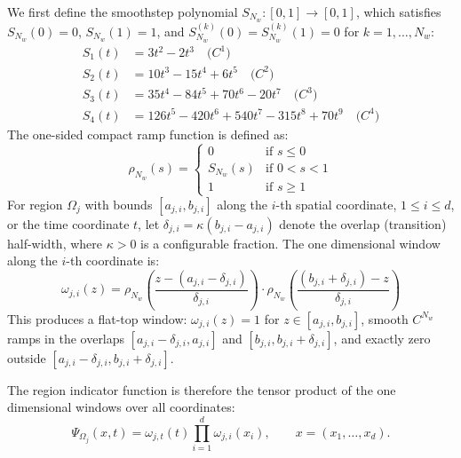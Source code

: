We first define the smoothstep polynomial $S_{N_w} : [0,1] \to [0,1]$,
which satisfies $S_{N_w}(0) = 0$, $S_{N_w}(1) = 1$, and
$S_{N_w}^{(k)}(0) = S_{N_w}^{(k)}(1) = 0$ for $k = 1, \ldots, N_w$:
\begin{align}
S_1(t) &= 3t^2 - 2t^3 \quad \text{($C^1$)} \\
S_2(t) &= 10t^3 - 15t^4 + 6t^5 \quad \text{($C^2$)} \\
S_3(t) &= 35t^4 - 84t^5 + 70t^6 - 20t^7 \quad \text{($C^3$)} \\
S_4(t) &= 126t^5 - 420t^6 + 540t^7 - 315t^8 + 70t^9 \quad \text{($C^4$)}
\end{align}
The one-sided compact ramp function is defined as:
\begin{equation}
\rho_{N_w}(s) = \begin{cases}
0 & \text{if } s \leq 0 \\
S_{N_w}(s) & \text{if } 0 < s < 1 \\
1 & \text{if } s \geq 1
\end{cases}
\end{equation}
For region $\Omega_j$ with bounds $[a_{j,i}, b_{j,i}]$ along
the $i$-th spatial coordinate, $1\le i\le d$, or the time
coordinate $t$, let $\delta_{j,i} = \kappa (b_{j,i} - a_{j,i})$ denote the
overlap (transition) half-width, where $\kappa > 0$ is a configurable fraction. The one dimensional window along the $i$-th coordinate is:
\begin{equation}
\omega_{j,i}(z) = \rho_{N_w}\!\left(\frac{z - (a_{j,i} - \delta_{j,i})}{\delta_{j,i}}\right) \cdot \rho_{N_w}\!\left(\frac{(b_{j,i} + \delta_{j,i}) - z}{\delta_{j,i}}\right)
\label{eq:window_1d}
\end{equation}
This produces a flat-top window: $\omega_{j,i}(z) = 1$ for
$z \in [a_{j,i}, b_{j,i}]$, smooth $C^{N_w}$ ramps in the overlaps
$[a_{j,i} - \delta_{j,i}, a_{j,i}]$ and $[b_{j,i}, b_{j,i} + \delta_{j,i}]$,
and exactly zero outside
$[a_{j,i} - \delta_{j,i}, b_{j,i} + \delta_{j,i}]$.

The region indicator function is therefore the tensor product of the one dimensional windows over all coordinates:
\begin{equation}
\Psi_{\Omega_j}(x,t) = \omega_{j,t}(t) \prod_{i=1}^{d} \omega_{j,i}(x_i),
\qquad x = (x_1,\ldots,x_d).
\label{eq:smoothstep_windows}
\end{equation}

